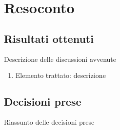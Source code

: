 \section{Resoconto}

\subsection{Risultati ottenuti}
Descrizione delle discussioni avvenute
\begin{enumerate}
    \item Elemento trattato: descrizione
\end{enumerate}

\subsection{Decisioni prese}
Riassunto delle decisioni prese
